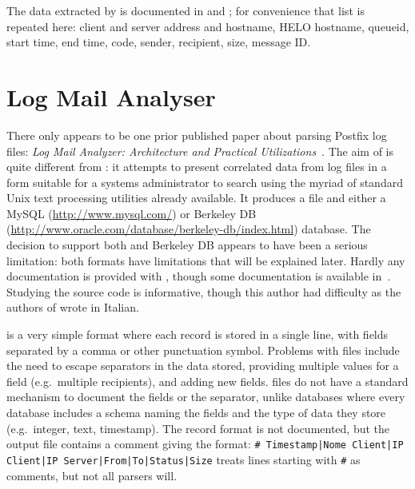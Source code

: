 The data extracted by \parsername{} is documented in
 and ; for
convenience that list is repeated here: client and server 
address and hostname, HELO hostname, queueid, start time, end time,
 code, sender, recipient, size, message ID\@.

\section{Log Mail Analyser}

\label{prior art}

There only appears to be one prior published paper about parsing Postfix
log files: \textit{Log Mail Analyzer: Architecture and Practical
Utilizations\/}~\cite{log-mail-analyser}.  The aim of  is
quite different from \parsername{}: it attempts to present correlated data
from log files in a form suitable for a systems administrator to search
using the myriad of standard Unix text processing utilities already
available.  It produces a  file and either a MySQL
(\url{http://www.mysql.com/}) or Berkeley DB
(\url{http://www.oracle.com/database/berkeley-db/index.html}) database.
The decision to support both  and Berkeley DB appears to have
been a serious limitation: both formats have limitations that will be
explained later.  Hardly any documentation is provided with ,
though some documentation is available in~\cite{log-mail-analyser}.
Studying the source code is informative, though this author had difficulty
as the authors of  wrote in Italian.

 is a very simple format where each record is stored in a
single line, with fields separated by a comma or other punctuation symbol.
Problems with  files include the need to escape separators in
the data stored, providing multiple values for a field (e.g.\ multiple
recipients), and adding new fields.   files do not have a
standard mechanism to document the fields or the separator, unlike
 databases where every database includes a schema naming the
fields and the type of data they store (e.g.\ integer, text, timestamp).
The  record format is not documented, but the output file
contains a comment giving the format:\newline{} \texttt{\# Timestamp|Nome
Client|IP Client|IP Server|From|To|Status|Size} \newline{}
treats  lines starting with \texttt{\#} as comments, but not
all  parsers will.

